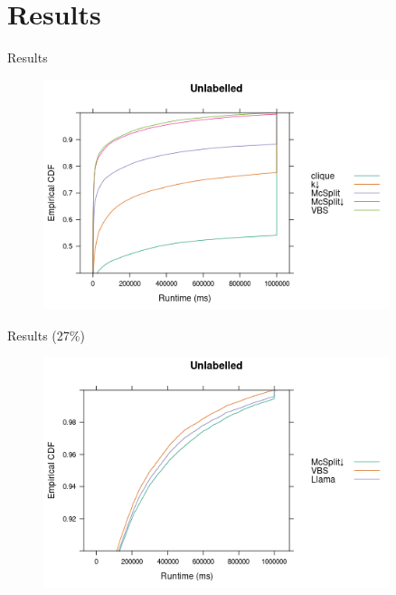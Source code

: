 \documentclass{beamer}
\begin{document}
\section{Results}

\begin{frame}{Results}
  \begin{figure}
    \centering
    \includegraphics[width=0.9\textwidth]{../dissertation/images/ecdf_unlabelled.png}
  \end{figure}
\end{frame}

\begin{frame}{Results (27\%)}
  \begin{figure}
    \centering
    \includegraphics[width=0.9\textwidth]{../dissertation/images/ecdf_unlabelled_llama.png}
  \end{figure}
\end{frame}
\end{document}
